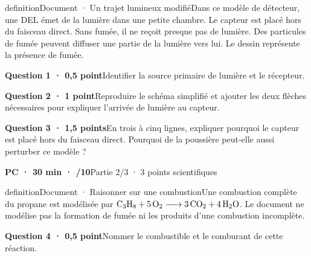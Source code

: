 \begin{pcEncadre}{definition}{Document · Un trajet lumineux modifié}Dans ce modèle de détecteur, une DEL émet de la lumière dans une petite chambre. Le capteur est placé hors du faisceau direct. Sans fumée, il ne reçoit presque pas de lumière. Des particules de fumée peuvent diffuser une partie de la lumière vers lui. Le dessin représente la présence de fumée.\end{pcEncadre}
\par\addvspace{3mm}\noindent\begin{minipage}{\linewidth}\textbf{Question 1 · 0,5 point}\quad Identifier la source primaire de lumière et le récepteur.\par\end{minipage}\par
\par\addvspace{3mm}\noindent\begin{minipage}{\linewidth}\textbf{Question 2 · 1 point}\quad Reproduire le schéma simplifié et ajouter les deux flèches nécessaires pour expliquer l’arrivée de lumière au capteur.\par\end{minipage}\par
\par\addvspace{3mm}\noindent\begin{minipage}{\linewidth}\textbf{Question 3 · 1,5 points}\quad En trois à cinq lignes, expliquer pourquoi le capteur est placé hors du faisceau direct. Pourquoi de la poussière peut-elle aussi perturber ce modèle ?\par\end{minipage}\par
\vfill{}
\textbf{PC · 30 min · /10}\hfill Partie 2/3 · 3 points scientifiques
\begin{pcEncadre}{definition}{Document · Raisonner sur une combustion}Une combustion complète du propane est modélisée par $\ce{C3H8 + 5 O2 -> 3 CO2 + 4 H2O}$. Le document ne modélise pas la formation de fumée ni les produits d’une combustion incomplète.\end{pcEncadre}
\par\addvspace{3mm}\noindent\begin{minipage}{\linewidth}\textbf{Question 4 · 0,5 point}\quad Nommer le combustible et le comburant de cette réaction.\par\end{minipage}\par
